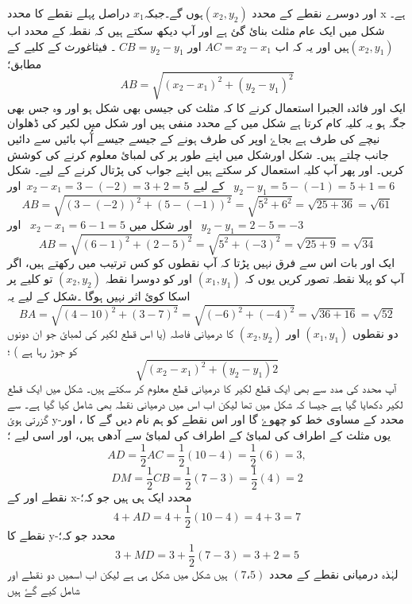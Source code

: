 اور دوسرے نقطے کے محدد  \((x_{2},y_{2})\)ہوں گے۔جبکہ\( x_{1} \) دراصل پہلے نقطے کا  محدد x  ہے۔
شکل  میں ایک عام مثلث بنائ گئ ہے اور آپ دیکھ سکتے ہیں کہ   نقطہ    کے محدد اب  \((x_{2},y_{1})\)ہیں اور یہ کہ اب \(AC = x_2 - x_1 \) اور \(CB=y_2 -y_1 \) ۔
فیثاغورث کے کلیے کے مطابق؛
\[ AB = \sqrt{(x_2 - x_1)^2 + (y_2 - y_1 )^2} \]
ایک اور فائدہ الجبرا استعمال کرنے کا کہ مثلث کی جیسی بھی شکل ہو اور وہ جس بھی جگہ ہو یہ کلیہ کام کرتا ہے  شکل  میں  کے  محدد منفی ہیں اور شکل   میں لکیر کی ڈھلوان نیچے کی طرف ہے بجاۓ اوپر کی طرف ہونے کے جیسے جیسے آُپ بائیں سے دائیں جانب چلتے ہیں۔ شکل  اورشکل  میں اپنے طور پر   کی لمبائ معلوم کرنے کی کوشش کریں۔ اور پھر آپ کلیہ استعمال کر سکتے ہیں اپنے جواب کی پڑتال کرنے کے لیے۔
شکل  کے لیے
\( x_2 - x_1 = 3-(-2) = 3+2 = 5\)\, اور \, \(y_2 - y_1 = 5-(-1) = 5+1 = 6\)
\[ AB = \sqrt{(3-(-2))^2 +(5-(-1))^2}= \sqrt{5^2 + 6^2} = \sqrt{25+36} =\sqrt{61}\]
اور  شکل   میں 
\( x_2 - x_1 = 6-1 = 5\) \, اور \, \(y_2 -y_1 = 2-5 = -3\)
 \[ AB = \sqrt{(6-1)^2 + (2-5)^2 }= \sqrt{5^2 + (-3)^2} = \sqrt{25 + 9} = \sqrt{34}\]
ایک اور بات اس سے فرق نہیں پڑتا کہ آپ نقطوں کو کس ترتیب میں رکھتے ہیں، اگر آپ  کو پہلا نقطہ تصور کریں یوں کہ   \((x_{1},y_{1})\)  اور   کو  دوسرا نقطہ      \((x_{2},y_{2})\)  تو کلیے پر اسکا کوئ اثر نہیں ہوگا ۔شکل کے لیے یہ 
\[ BA = \sqrt{(4-10)^2 + (3-7)^2} = \sqrt{(-6)^2 + (-4)^2 } = \sqrt{36+16} = \sqrt{52}\]
دو نقطوں  \((x_{1},y_{1})\) اور  \((x_{2},y_{2})\) کا درمیانی فاصلہ (یا اس قطع لکیر کی لمبائ جو ان دونوں کو جوڑ رہا ہے ) ؛
\[ \sqrt{(x_2-x_1)^2 + (y_2 - y_1)2}\]
آپ محدد کی مدد سے بھی ایک قطع لکیر کا درمیانی قطع معلوم کر سکتے ہیں۔
شکل میں ایک قطع لکیر دکھایا گیا ہے جیسا کہ شکل  میں تھا لیکن اب اس میں درمیانی نقطہ    بھی شامل کیا گیا ہے۔   سے گزرتی ہوئ   y-محدد کے مساوی خط     کو چھوۓ گا اور اس نقطے کو ہم نام دیں گے    کا ، اور یوں مثلث   کے اطراف کی لمبائ    کے اطراف کی لمبائ سے   آدھی ہیں، اور اسی لیے ؛   \[ AD = \frac{1}{2} AC = \frac{1}{2} (10-4) = \frac{1}{2} (6)= 3,\]
\[ DM = \frac{1}{2} CB= \frac{1}{2} (7-3) = \frac{1}{2} (4)=2\]
نقطے   اور   کے x-محدد ایک ہی ہیں جو کہ؛
\[ 4+AD=4+ \frac{1}{2} (10-4) = 4+3 =7\] 
نقطے    کا y-محدد جو کہ؛
\[ 3+MD = 3+ \frac{1}{2} (7-3) = 3+2 = 5\]
لہٰذہ درمیانی  نقطے     کے محدد    \( (7،5 )  \) ہیں 
شکل  میں شکل  ہی ہے لیکن اب اسمیں دو نقطے   اور   شامل کیے گۓ ہیں 
